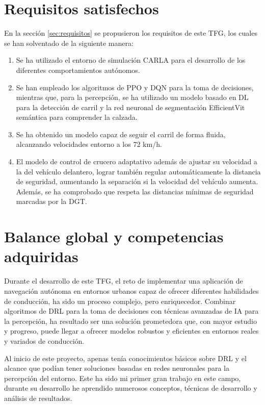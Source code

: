 \section{Requisitos satisfechos}

En la sección \ref{sec:requisitos} se propusieron los requisitos de este \ac{TFG}, los cuales se han solventado de la siguiente manera:

\begin{enumerate}
\item Se ha utilizado el entorno de simulación CARLA para el desarrollo de los diferentes comportamientos autónomos.
\item Se han empleado los algoritmos de \ac{PPO} y \ac{DQN} para la toma de decisiones, mientras que, para la percepción, se ha utilizado un modelo basado en \ac{DL} para la detección de carril y la red neuronal de segmentación EfficientVit semántica para comprender la calzada.
\item Se ha obtenido un modelo capaz de seguir el carril de forma fluida, alcanzando velocidades entorno a los 72 km/h.
\item El modelo de control de crucero adaptativo además de ajustar su velocidad a la del vehículo delantero, lograr también regular automáticamente la distancia de seguridad, aumentando la separación si la velocidad del vehículo aumenta. Además, se ha comprobado que respeta las distancias mínimas de seguridad marcadas por la \ac{DGT}.
\end{enumerate}

\section{Balance global y competencias adquiridas}

Durante el desarrollo de este \ac{TFG}, el reto de implementar una aplicación de navegación autónoma en entornos urbanos capaz de ofrecer diferentes habilidades de conducción, ha sido un proceso complejo, pero enriquecedor. Combinar algoritmos de \ac{DRL} para la toma de decisiones con técnicas avanzadas de \ac{IA} para la percepción, ha resultado ser una solución prometedora que, con mayor estudio y progreso, puede llegar a ofrecer modelos robustos y eficientes en entornos reales y variados de conducción.

Al inicio de este proyecto, apenas tenía conocimientos básicos sobre \ac{DRL} y el alcance que podían tener soluciones basadas en redes neuronales para la percepción del entorno. Este ha sido mi primer gran trabajo en este campo, durante su desarrollo he aprendido numerosos conceptos, técnicas de desarrollo y análisis de resultados.

